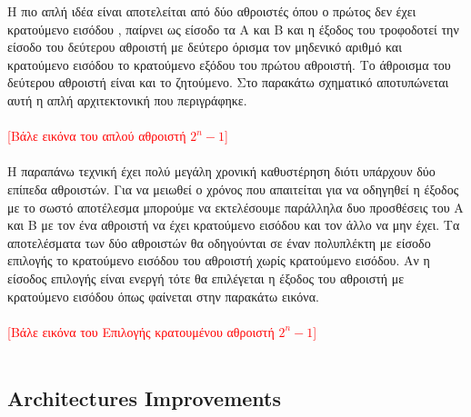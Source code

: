 Η πιο απλή ιδέα είναι αποτελείται από δύο αθροιστές όπου ο πρώτος δεν έχει
κρατούμενο εισόδου , παίρνει ως είσοδο τα Α και Β και η έξοδος του τροφοδοτεί
την είσοδο του δεύτερου αθροιστή με δεύτερο όρισμα τον μηδενικό αριθμό
και κρατούμενο εισόδου το κρατούμενο εξόδου του πρώτου αθροιστή. Το άθροισμα 
του δεύτερου αθροιστή είναι και το ζητούμενο. Στο παρακάτω σχηματικό αποτυπώνεται
αυτή η απλή αρχιτεκτονική που περιγράφηκε.
\\\\
\textcolor{red}{[Βάλε εικόνα του απλού αθροιστή $2^n-1$]}
\\\\
Η παραπάνω τεχνική έχει πολύ μεγάλη χρονική καθυστέρηση διότι υπάρχουν δύο 
επίπεδα αθροιστών. Για να μειωθεί ο χρόνος που απαιτείται για να οδηγηθεί η έξοδος
με το σωστό αποτέλεσμα μπορούμε να εκτελέσουμε παράλληλα δυο προσθέσεις του Α και Β
με τον ένα αθροιστή να έχει κρατούμενο εισόδου και τον άλλο να μην έχει. Τα αποτελέσματα 
των δύο αθροιστών θα οδηγούνται σε έναν πολυπλέκτη με είσοδο επιλογής το κρατούμενο 
εισόδου του αθροιστή χωρίς κρατούμενο εισόδου. Αν η είσοδος επιλογής είναι ενεργή 
τότε θα επιλέγεται η έξοδος του αθροιστή με κρατούμενο εισόδου όπως φαίνεται στην 
παρακάτω εικόνα.
\\\\
\textcolor{red}{[Βάλε εικόνα του Επιλογής κρατουμένου αθροιστή $2^n-1$]}
\\\\

\subsection{Architectures Improvements}
















